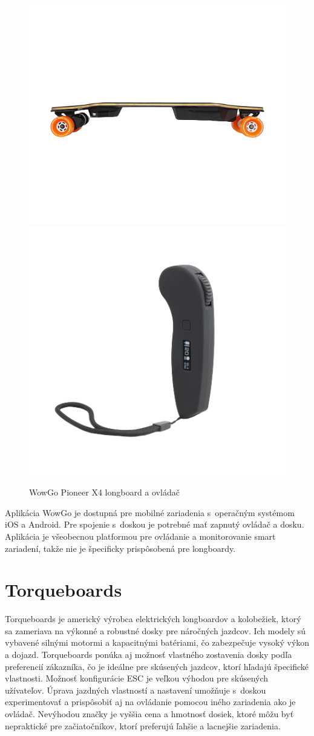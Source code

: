 \begin{figure}[h]
    \centering
    \includegraphics[width=0.48\linewidth]{figures/brand-reviews/wowgo-longboard.png}\hfill
    \includegraphics[width=0.48\linewidth]{figures/brand-reviews/wowgo-controller.png}
    \caption{WowGo Pioneer X4 longboard a ovládač\cite{WowGo}}\label{fig:wowgo}
\end{figure}

Aplikácia WowGo je dostupná pre mobilné zariadenia s~operačným systémom iOS a Android.
Pre spojenie s~doskou je potrebné mať zapnutý ovládač a dosku.
Aplikácia je všeobecnou platformou pre ovládanie a monitorovanie smart zariadení, takže nie je špecificky prispôsobená pre longboardy.\cite{WowGo}

\section{Torqueboards}
Torqueboards je americký výrobca elektrických longboardov a kolobežiek, ktorý sa zameriava na výkonné a robustné dosky pre náročných jazdcov.
Ich modely sú vybavené silnými motormi a kapacitnými batériami, čo zabezpečuje vysoký výkon a dojazd.
Torqueboards ponúka aj možnosť vlastného zostavenia dosky podľa preferencií zákazníka, čo je ideálne pre skúsených jazdcov, ktorí hľadajú špecifické vlastnosti.
Možnosť konfigurácie ESC je veľkou výhodou pre skúsených užívateľov.
Úprava jazdných vlastností a nastavení umožňuje s~doskou experimentovať a prispôsobiť aj na ovládanie pomocou iného zariadenia ako je ovládač. 
Nevýhodou značky je vyššia cena a hmotnosť dosiek, ktoré môžu byť nepraktické pre začiatočníkov, ktorí preferujú ľahšie a lacnejšie zariadenia.\cite{TorqueBoards}

